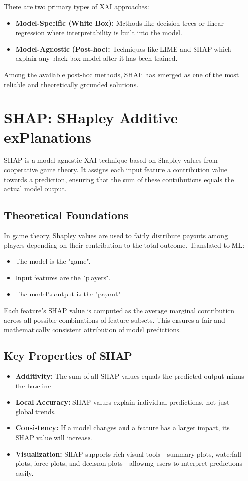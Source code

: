 \documentclass[a4paper,11pt,oneside]{book}
\begin{document}
There are two primary types of XAI approaches:
\begin{itemize}
    \item \textbf{Model-Specific (White Box):} Methods like decision trees or linear regression where interpretability is built into the model.
    \item \textbf{Model-Agnostic (Post-hoc):} Techniques like LIME and SHAP which explain any black-box model after it has been trained.
\end{itemize}

Among the available post-hoc methods, SHAP has emerged as one of the most reliable and theoretically grounded solutions.

\section{SHAP: SHapley Additive exPlanations}

SHAP is a model-agnostic XAI technique based on Shapley values from cooperative game theory. It assigns each input feature a contribution value towards a prediction, ensuring that the sum of these contributions equals the actual model output.

\subsection{Theoretical Foundations}

In game theory, Shapley values are used to fairly distribute payouts among players depending on their contribution to the total outcome. Translated to ML:
\begin{itemize}
    \item The model is the "game".
    \item Input features are the "players".
    \item The model's output is the "payout".
\end{itemize}

Each feature's SHAP value is computed as the average marginal contribution across all possible combinations of feature subsets. This ensures a fair and mathematically consistent attribution of model predictions.

\subsection{Key Properties of SHAP}

\begin{itemize}
    \item \textbf{Additivity:} The sum of all SHAP values equals the predicted output minus the baseline.
    \item \textbf{Local Accuracy:} SHAP values explain individual predictions, not just global trends.
    \item \textbf{Consistency:} If a model changes and a feature has a larger impact, its SHAP value will increase.
    \item \textbf{Visualization:} SHAP supports rich visual tools—summary plots, waterfall plots, force plots, and decision plots—allowing users to interpret predictions easily.
\end{itemize}
\end{document}
